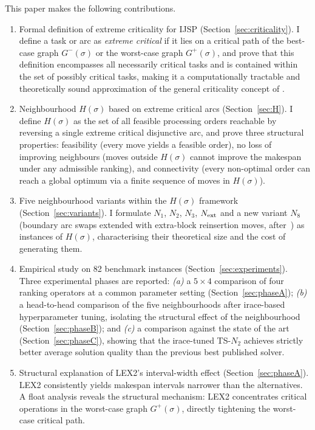 \documentclass[preprint,12pt]{elsarticle}
\begin{document}
This paper makes the following contributions.
\begin{enumerate}
\item Formal definition of extreme criticality for IJSP (Section~\ref{sec:criticality}). I define a task or arc as \emph{extreme critical} if it lies on a critical path of the best-case graph $G^-(\sigma)$ or the worst-case graph $G^+(\sigma)$, and prove that this definition encompasses all necessarily critical tasks and is contained within the set of possibly critical tasks, making it a computationally tractable and theoretically sound approximation of the general criticality concept of \cite{Artigues2015}.

\item Neighbourhood $H(\sigma)$ based on extreme critical arcs (Section~\ref{sec:H}). I define $H(\sigma)$ as the set of all feasible processing orders reachable by reversing a single extreme critical disjunctive arc, and prove three structural properties: feasibility (every move yields a feasible order), no loss of improving neighbours (moves outside $H(\sigma)$ cannot improve the makespan under any admissible ranking), and connectivity (every non-optimal order can reach a global optimum via a finite sequence of moves in $H(\sigma)$).

\item Five neighbourhood variants within the $H(\sigma)$ framework (Section~\ref{sec:variants}). I formulate $N_1$, $N_2$, $N_3$, $N_{\rm ext}$ and a new variant $N_8$ (boundary arc swaps extended with extra-block reinsertion moves, after~\cite{Xie2022}) as instances of $H(\sigma)$, characterising their theoretical size and the cost of generating them.

\item Empirical study on 82 benchmark instances (Section~\ref{sec:experiments}). Three experimental phases are reported: \emph{(a)} a $5 \times 4$ comparison of four ranking operators at a common parameter setting (Section~\ref{sec:phaseA}); \emph{(b)} a head-to-head comparison of the five neighbourhoods after irace-based hyperparameter tuning, isolating the structural effect of the neighbourhood (Section~\ref{sec:phaseB}); and \emph{(c)} a comparison against the state of the art (Section~\ref{sec:phaseC}), showing that the irace-tuned TS-$N_2$ achieves strictly better average solution quality than the previous best published solver.

\item Structural explanation of LEX2's interval-width effect (Section~\ref{sec:phaseA}). LEX2 consistently yields makespan intervals narrower than the alternatives. A float analysis reveals the structural mechanism: LEX2 concentrates critical operations in the worst-case graph $G^+(\sigma)$, directly tightening the worst-case critical path.
\end{enumerate}
\end{document}
